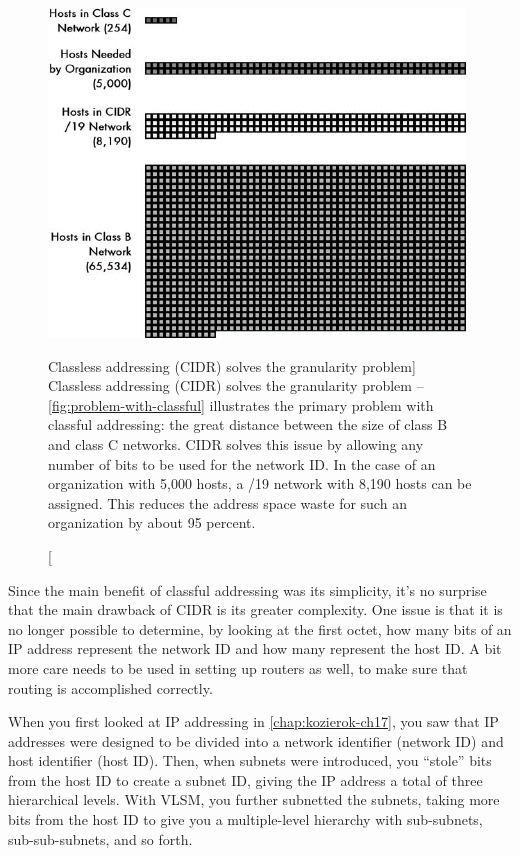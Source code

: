 \begin{figure}
   \centering
   \includegraphics[width=.9\textwidth]{images/cidr-solves-granularity.jpg}
   \caption
      [Classless addressing (CIDR) solves the granularity problem]
      {Classless addressing (CIDR) solves the granularity problem --
      \vref{fig:problem-with-classful} illustrates the primary problem with classful addressing:
      the great distance between the size of class B and class C networks.
      CIDR solves this issue by allowing any number of bits to be used for the network ID.
      In the case of an organization with 5,000 hosts, a /19 network with 8,190 hosts can be assigned.
      This reduces the address space waste for such an organization by about 95 percent.}
   \label{fig:cidr-solves-granularity}
\end{figure}

Since the main benefit of classful addressing was its simplicity, it's
no surprise that the main drawback of CIDR is its greater complexity.
One issue is that it is no longer possible to determine, by looking at
the first octet, how many bits of an IP address represent the network ID
and how many represent the host ID. A bit more care needs to be used in
setting up routers as well, to make sure that routing is accomplished
correctly.

When you first looked at IP addressing in \cref{chap:kozierok-ch17},
you saw that IP addresses were designed to be divided into a network identifier (network ID) and host identifier (host ID).
Then, when subnets were introduced, you ``stole'' bits from the host ID to create a subnet ID, giving the IP address a total of three hierarchical levels.
With VLSM, you further subnetted the subnets, taking more bits from the host ID to give you a multiple-level hierarchy with sub-subnets,
sub-sub-subnets, and so forth.

